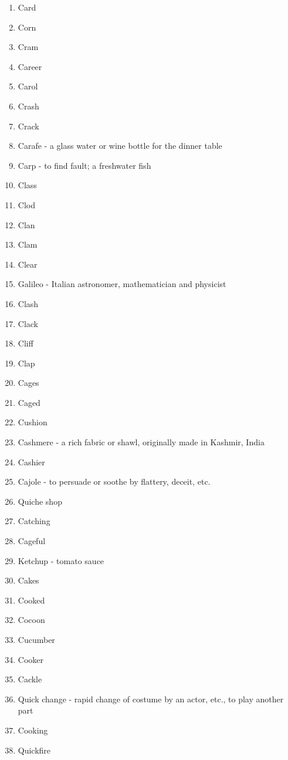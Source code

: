 \begin{enumerate}
        \item Card
        \item Corn
        \item Cram
        \item Career
        \item Carol
        \item Crash
        \item Crack
        \item Carafe - a glass water or wine bottle for the dinner table
        \item Carp - to find fault; a freshwater fish
        \item Class
        \item Clod
        \item Clan
        \item Clam
        \item Clear
        \item Galileo - Italian astronomer, mathematician and physicist
        \item Clash
        \item Clack
        \item Cliff
        \item Clap
        \item Cages
        \item Caged
        \item Cushion
        \item Cashmere - a rich fabric or shawl, originally made in Kashmir, India
        \item Cashier
        \item Cajole - to persuade or soothe by flattery, deceit, etc.
        \item Quiche shop
        \item Catching
        \item Cageful
        \item Ketchup - tomato sauce
        \item Cakes
        \item Cooked
        \item Cocoon
        \item Cucumber
        \item Cooker
        \item Cackle
        \item Quick change - rapid change of costume by an actor, etc., to play another part
        \item Cooking
        \item Quickfire

\end{enumerate}
